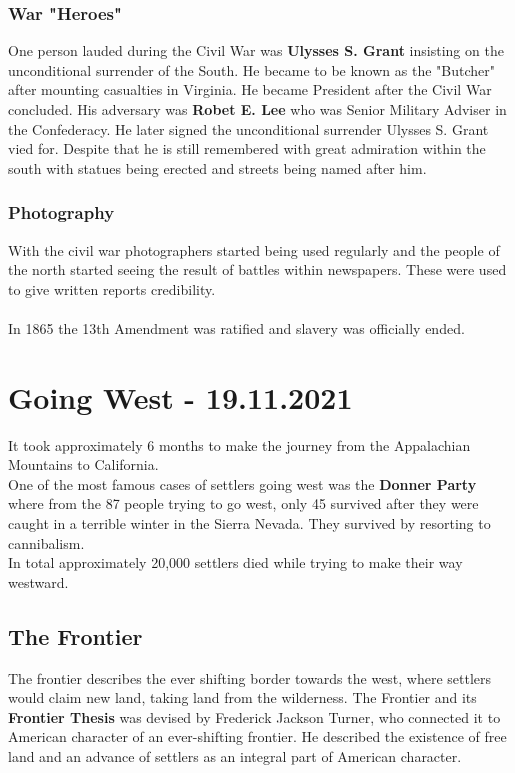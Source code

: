 \documentclass{article}
\begin{document}
	\subsubsection{War "Heroes"}
	One person lauded during the Civil War was \textbf{Ulysses S. Grant} insisting on the unconditional surrender of the South. He became to be known as the "Butcher" after mounting casualties in Virginia. He became President after the Civil War concluded.
	His adversary was \textbf{Robet E. Lee} who was Senior Military Adviser in the Confederacy. He later signed the unconditional surrender Ulysses S. Grant vied for. Despite that he is still remembered with great admiration within the south with statues being erected and streets being named after him. \\
	\subsubsection{Photography}
	With the civil war photographers started being used regularly and the people of the north started seeing the result of battles within newspapers. These were used to give written reports credibility. \\ \\
	In 1865 the 13th Amendment was ratified and slavery was officially ended. \\
	\section{Going West - 19.11.2021}
	It took approximately 6 months to make the journey from the Appalachian Mountains to California. \\
	One of the most famous cases of settlers going west was the \textbf{Donner Party} where from the 87 people trying to go west, only 45 survived after they were caught in a terrible winter in the Sierra Nevada. They survived by resorting to cannibalism. \\
	In total approximately 20,000 settlers died while trying to make their way westward. \\
	\subsection{The Frontier}
	The frontier describes the ever shifting border towards the west, where settlers would claim new land, taking land from the wilderness. The Frontier and its \textbf{Frontier Thesis} was devised by Frederick Jackson Turner, who connected it to American character of an ever-shifting frontier. He described the existence of free land and an advance of settlers as an integral part of American character. \\
\end{document}
